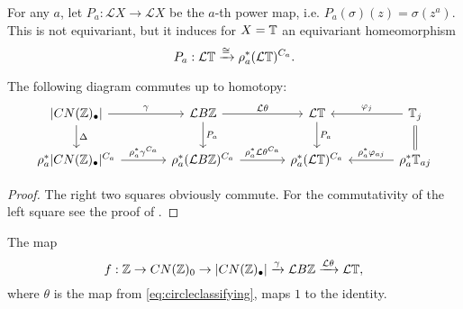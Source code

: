 For any $a$, let $P_a:\mathcal{L}X\to \mathcal{L}X$ be the $a$-th power map,
i.e. $P_a(\sigma)(z) = \sigma(z^a)$. This is not equivariant, but it induces
for $X = \mathbb{T}$ an equivariant homeomorphism
\[
P_a:\mathcal{L}\mathbb{T}\xrightarrow{\cong} \rho_a^{\ast}(\mathcal{L}\mathbb{T})^{C_a}.
\]
\begin{prop}\label{prop:cyclicnervefixedpoints}
The following diagram commutes up to homotopy:
\[
\begin{tikzcd}[column sep = large]
\lvert CN(\ZZ)_\bullet\rvert
\arrow{r}{\gamma}\arrow{d}{\Delta}
&\mathcal{L}B\ZZ
\arrow{r}{\mathcal{L}\theta}\arrow{d}{P_a}
&\mathcal{L}\TT
\arrow{d}{P_{a}}
&\TT_j\arrow[swap]{l}{\varphi_j}\arrow[equal]{d}\\
\rho_{a}^\ast \lvert CN(\ZZ)_\bullet\rvert^{C_{a}}
\arrow{r}{\rho_{a}^\ast\gamma^{C_{a}}}
&\rho_{a}^\ast (\mathcal{L} B\ZZ)^{C_{a}}
\arrow{r}{\rho_a^\ast \mathcal{L}\theta^{C_a}}
&\rho_{a}^\ast (\mathcal{L} \TT)^{C_{a}}
&\rho_{a}^\ast \TT_{aj}\arrow[swap]{l}{\rho_{a}^\ast \varphi_{aj}}
\end{tikzcd}
\]
\end{prop}
\begin{proof}
The right two squares obviously commute.
For the commutativity of the left square see the proof of 
\cite[Proposition~2.6, \pno~473]{bhmcyclotomic}.
\end{proof}

\begin{prop}\label{prop:cyclicnervegrading}
The map
\[
f:\mathbb{Z}\to CN(\mathbb{Z})_0\to |CN(\mathbb{Z})_\bullet|\xrightarrow{\gamma} \mathcal{L}B\mathbb{Z}\xrightarrow{\mathcal{L}\theta} \mathcal{L}\mathbb{T},
\]
where $\theta$ is the map from \eqref{eq:circleclassifying}, maps $1$ to the identity.
\end{prop}

